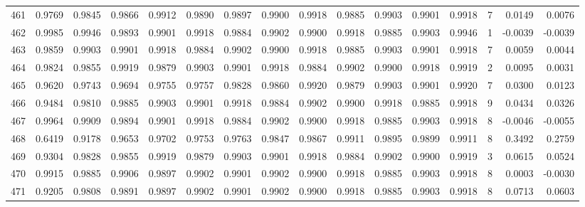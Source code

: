 \begin{tabular}{lrrrrrrrrrrrrrrr}
461 &      0.9769 &  0.9845 &  0.9866 &  0.9912 &  0.9890 &  0.9897 &  0.9900 &  0.9918 &  0.9885 &  0.9903 &   0.9901 &     0.9918 &      7 &                    0.0149 &                     0.0076 \\
462 &      0.9985 &  0.9946 &  0.9893 &  0.9901 &  0.9918 &  0.9884 &  0.9902 &  0.9900 &  0.9918 &  0.9885 &   0.9903 &     0.9946 &      1 &                   -0.0039 &                    -0.0039 \\
463 &      0.9859 &  0.9903 &  0.9901 &  0.9918 &  0.9884 &  0.9902 &  0.9900 &  0.9918 &  0.9885 &  0.9903 &   0.9901 &     0.9918 &      7 &                    0.0059 &                     0.0044 \\
464 &      0.9824 &  0.9855 &  0.9919 &  0.9879 &  0.9903 &  0.9901 &  0.9918 &  0.9884 &  0.9902 &  0.9900 &   0.9918 &     0.9919 &      2 &                    0.0095 &                     0.0031 \\
465 &      0.9620 &  0.9743 &  0.9694 &  0.9755 &  0.9757 &  0.9828 &  0.9860 &  0.9920 &  0.9879 &  0.9903 &   0.9901 &     0.9920 &      7 &                    0.0300 &                     0.0123 \\
466 &      0.9484 &  0.9810 &  0.9885 &  0.9903 &  0.9901 &  0.9918 &  0.9884 &  0.9902 &  0.9900 &  0.9918 &   0.9885 &     0.9918 &      9 &                    0.0434 &                     0.0326 \\
467 &      0.9964 &  0.9909 &  0.9894 &  0.9901 &  0.9918 &  0.9884 &  0.9902 &  0.9900 &  0.9918 &  0.9885 &   0.9903 &     0.9918 &      8 &                   -0.0046 &                    -0.0055 \\
468 &      0.6419 &  0.9178 &  0.9653 &  0.9702 &  0.9753 &  0.9763 &  0.9847 &  0.9867 &  0.9911 &  0.9895 &   0.9899 &     0.9911 &      8 &                    0.3492 &                     0.2759 \\
469 &      0.9304 &  0.9828 &  0.9855 &  0.9919 &  0.9879 &  0.9903 &  0.9901 &  0.9918 &  0.9884 &  0.9902 &   0.9900 &     0.9919 &      3 &                    0.0615 &                     0.0524 \\
470 &      0.9915 &  0.9885 &  0.9906 &  0.9897 &  0.9902 &  0.9901 &  0.9902 &  0.9900 &  0.9918 &  0.9885 &   0.9903 &     0.9918 &      8 &                    0.0003 &                    -0.0030 \\
471 &      0.9205 &  0.9808 &  0.9891 &  0.9897 &  0.9902 &  0.9901 &  0.9902 &  0.9900 &  0.9918 &  0.9885 &   0.9903 &     0.9918 &      8 &                    0.0713 &                     0.0603 \\

\end{tabular}
